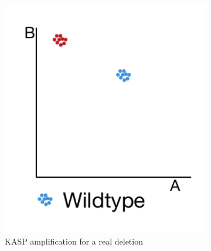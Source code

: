 \begin{figure}
    \begin{subfigure}[b]{0.3\textwidth}
        \includegraphics[width=1\textwidth]{PolyMarker/Figures/deletions/homReal.pdf}
        \caption{KASP amplification for a real deletion}
        \label{fig:poly:homReal}
    \end{subfigure}
    ~ %
    \begin{subfigure}[b]{0.3\textwidth}

\end{subfigure}
\end{figure}
